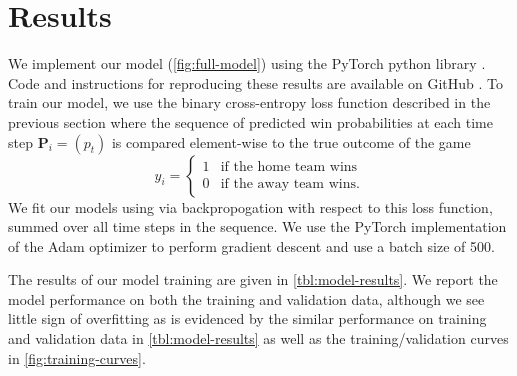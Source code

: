 \section{Results}

We implement our model (\autoref{fig:full-model}) using the PyTorch python library \cite{pytorch}. Code and instructions for reproducing these results are available on GitHub \cite{stat-comps-github}. To train our model, we use the binary cross-entropy loss function described in the previous section where the sequence of predicted win probabilities at each time step $\mathbf P_i = (p_t)$ is compared element-wise to the true outcome of the game
\begin{equation}
	y_i = \begin{cases}
		1 & \text{if the home team wins}  \\
		0 & \text{if the away team wins}.
	\end{cases}
\end{equation}
We fit our models using via backpropogation with respect to this loss function, summed over all time steps in the sequence. We use the PyTorch implementation of the Adam optimizer \cite{adam} to perform gradient descent and use a batch size of 500.

The results of our model training are given in \autoref{tbl:model-results}. We report the model performance on both the training and validation data, although we see little sign of overfitting as is evidenced by the similar performance on training and validation data in \autoref{tbl:model-results} as well as the training/validation curves in \autoref{fig:training-curves}.

